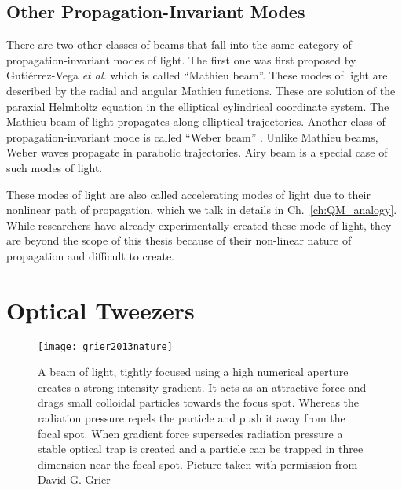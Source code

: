 \subsection{Other Propagation-Invariant Modes}

There are two other classes of beams that fall into the same category of propagation-invariant modes of light. The first one was first proposed by Gutiérrez-Vega \emph{et al.} \cite{Gutierrez-Vega:00} which is called ``Mathieu beam''. These modes of light are described by the radial and angular Mathieu functions. These are solution of the paraxial Helmholtz equation in the elliptical cylindrical coordinate system. The Mathieu beam of light propagates along elliptical trajectories. Another class of propagation-invariant mode is called ``Weber beam'' \cite{Bandres_2013}. Unlike Mathieu beams, Weber waves propagate in parabolic trajectories. Airy beam is a special case of such modes of light.

These modes of light are also called accelerating modes of light due to their nonlinear path of propagation, which we talk in details in Ch.~\eqref{ch:QM_analogy}. While researchers have already experimentally created these mode of light, they are beyond the scope of this thesis because of their non-linear nature of propagation and difficult to create.

\section{Optical Tweezers}
\begin{figure}[t!]
  \centering
  \texttt{[image: grier2013nature]}
  \caption{A beam of light, tightly focused using a high numerical aperture creates a strong intensity gradient. It acts as an attractive force and drags small colloidal particles towards the focus spot. Whereas the radiation pressure repels the particle and push it away from the focal spot. When gradient force supersedes radiation pressure a stable optical trap is created and a particle can be trapped in three dimension near the focal spot. Picture taken with permission from David G. Grier \cite{grier2003nature}}
  \label{fig:Optical tweezers}
\end{figure}

